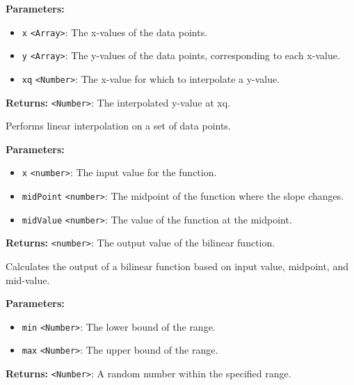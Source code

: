 \documentclass[12pt,a4paper]{article}
\begin{document}
\noindent \textbf{Parameters:}
\begin{itemize}
  \item \texttt{x} \texttt{<Array>}: The x-values of the data points.
  \item \texttt{y} \texttt{<Array>}: The y-values of the data points, corresponding to each x-value.
  \item \texttt{xq} \texttt{<Number>}: The x-value for which to interpolate a y-value.
\end{itemize}

\noindent \textbf{Returns:} \texttt{<Number>}: The interpolated y-value at xq.

\noindent Performs linear interpolation on a set of data points.

\vspace{5mm}
\noindent {}


\noindent \textbf{Parameters:}
\begin{itemize}
  \item \texttt{x} \texttt{<number>}: The input value for the function.
  \item \texttt{midPoint} \texttt{<number>}: The midpoint of the function where the slope changes.
  \item \texttt{midValue} \texttt{<number>}: The value of the function at the midpoint.
\end{itemize}

\noindent \textbf{Returns:} \texttt{<number>}: The output value of the bilinear function.

\noindent Calculates the output of a bilinear function based on input value, midpoint, and mid-value.

\vspace{5mm}
\noindent {}


\noindent \textbf{Parameters:}
\begin{itemize}
  \item \texttt{min} \texttt{<Number>}: The lower bound of the range.
  \item \texttt{max} \texttt{<Number>}: The upper bound of the range.
\end{itemize}

\noindent \textbf{Returns:} \texttt{<Number>}: A random number within the specified range.
\end{document}
